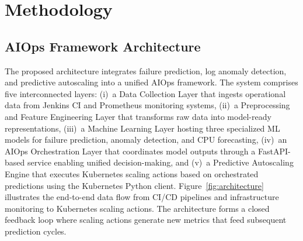 \documentclass[sn-nature]{sn-jnl}
\theoremstyle{thmstyleone}
\theoremstyle{thmstyletwo}
\theoremstyle{thmstylethree}
\begin{document}
\section{Methodology}\label{sec:framework}

\subsection{AIOps Framework Architecture}\label{subsec:overview}

The proposed architecture integrates failure prediction, log anomaly detection, and predictive autoscaling into a unified AIOps framework.
The system comprises five interconnected layers: (i)~a Data Collection Layer that ingests operational data from Jenkins CI and Prometheus monitoring systems, (ii)~a Preprocessing and Feature Engineering Layer that transforms raw data into model-ready representations, (iii)~a Machine Learning Layer hosting three specialized ML models for failure prediction, anomaly detection, and CPU forecasting, (iv)~an AIOps Orchestration Layer that coordinates model outputs through a FastAPI-based service enabling unified decision-making, and (v)~a Predictive Autoscaling Engine that executes Kubernetes scaling actions based on orchestrated predictions using the Kubernetes Python client.
Figure~\ref{fig:architecture} illustrates the end-to-end data flow from CI/CD pipelines and infrastructure monitoring to Kubernetes scaling actions.
The architecture forms a closed feedback loop where scaling actions generate new metrics that feed subsequent prediction cycles.
\end{document}

